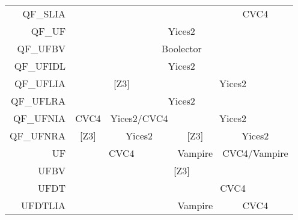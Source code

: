 \begin{table}[]
\begin{center}
{\begin{tabular}{rcccc}
QF\_SLIA                        & \multicolumn{1}{l}{}          & \multicolumn{1}{l}{}                & \multicolumn{1}{l|}{}         & \multicolumn{1}{c|}{CVC4}             \\ \cline{2-5} 
\multicolumn{1}{r|}{QF\_UF}     & \multicolumn{4}{c|}{Yices2}                                                                                                                 \\ \cline{2-5} 
\multicolumn{1}{r|}{QF\_UFBV}   & \multicolumn{4}{c|}{Boolector}                                                                                                              \\ \cline{2-5} 
\multicolumn{1}{r|}{QF\_UFIDL}  & \multicolumn{4}{c|}{Yices2}                                                                                                                 \\ \cline{2-5} 
\multicolumn{1}{r|}{QF\_UFLIA}  & \multicolumn{2}{c|}{{[}Z3{]}}                                       & \multicolumn{2}{c|}{Yices2}                                           \\ \cline{2-5} 
\multicolumn{1}{r|}{QF\_UFLRA}  & \multicolumn{4}{c|}{Yices2}                                                                                                                 \\ \cline{2-5} 
\multicolumn{1}{r|}{QF\_UFNIA}  & \multicolumn{1}{c|}{CVC4}     & \multicolumn{1}{c|}{Yices2/CVC4}    & \multicolumn{2}{c|}{Yices2}                                           \\ \cline{2-5} 
\multicolumn{1}{r|}{QF\_UFNRA}  & \multicolumn{1}{c|}{{[}Z3{]}} & \multicolumn{1}{c|}{Yices2}         & \multicolumn{1}{c|}{{[}Z3{]}} & \multicolumn{1}{c|}{Yices2}           \\ \cline{2-5} 
\multicolumn{1}{r|}{UF}         & \multicolumn{2}{c|}{CVC4}                                           & \multicolumn{1}{c|}{Vampire}  & \multicolumn{1}{c|}{CVC4/Vampire}     \\ \cline{2-5} 
\multicolumn{1}{r|}{UFBV}       & \multicolumn{4}{c|}{{[}Z3{]}}                                                                                                               \\ \cline{2-5} 
UFDT                            & \multicolumn{1}{l}{}          & \multicolumn{1}{l|}{}               & \multicolumn{2}{c|}{CVC4}                                             \\ \cline{4-5} 
UFDTLIA                         & \multicolumn{1}{l}{}          & \multicolumn{1}{l|}{}               & \multicolumn{1}{c|}{Vampire}  & \multicolumn{1}{c|}{CVC4}             \\ \cline{2-5} 

\end{tabular}}
\end{center}
\end{table}

